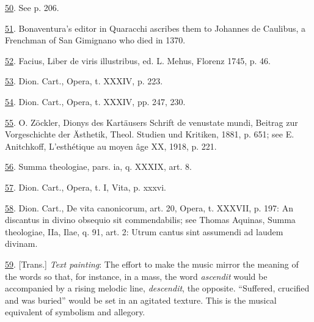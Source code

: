 \protect\hypertarget{23_NOTES.xhtmlux5cux23id_374}{\protect\hyperlink{20_ILLUSTRATIONS_FOLLOW_PAGE.xhtmlux5cux23id_373}{50}}.
See p. 206.

\protect\hypertarget{23_NOTES.xhtmlux5cux23id_372}{\protect\hyperlink{20_ILLUSTRATIONS_FOLLOW_PAGE.xhtmlux5cux23id_371}{51}}.
Bonaventura's editor in Quaracchi ascribes them to Johannes de Caulibus,
a Frenchman of San Gimignano who died in 1370.

\protect\hypertarget{23_NOTES.xhtmlux5cux23id_370}{\protect\hyperlink{20_ILLUSTRATIONS_FOLLOW_PAGE.xhtmlux5cux23id_369}{52}}.
Facius, Liber de viris illustribus, ed. L. Mehus, Florenz 1745, p. 46.

\protect\hypertarget{23_NOTES.xhtmlux5cux23id_368}{\protect\hyperlink{20_ILLUSTRATIONS_FOLLOW_PAGE.xhtmlux5cux23id_367}{53}}.
Dion. Cart., Opera, t. XXXIV, p. 223.

\protect\hypertarget{23_NOTES.xhtmlux5cux23id_366}{\protect\hyperlink{20_ILLUSTRATIONS_FOLLOW_PAGE.xhtmlux5cux23id_365}{54}}.
Dion. Cart., Opera, t. XXXIV, pp. 247, 230.

\protect\hypertarget{23_NOTES.xhtmlux5cux23id_364}{\protect\hyperlink{20_ILLUSTRATIONS_FOLLOW_PAGE.xhtmlux5cux23id_363}{55}}.
O. Zöckler, Dionys des Kartäusers Schrift de venustate mundi, Beitrag
zur Vorgeschichte der Ästhetik, Theol. Studien und Kritiken, 1881, p.
651; see E. Anitchkoff, L'esthétique au moyen âge XX, 1918, p. 221.

\protect\hypertarget{23_NOTES.xhtmlux5cux23id_362}{\protect\hyperlink{20_ILLUSTRATIONS_FOLLOW_PAGE.xhtmlux5cux23id_361}{56}}.
Summa theologiae, pars. ia, q. XXXIX, art. 8.

\protect\hypertarget{23_NOTES.xhtmlux5cux23id_360}{\protect\hyperlink{20_ILLUSTRATIONS_FOLLOW_PAGE.xhtmlux5cux23id_359}{57}}.
Dion. Cart., Opera, t. I, Vita, p. xxxvi.

\protect\hypertarget{23_NOTES.xhtmlux5cux23id_358}{\protect\hyperlink{20_ILLUSTRATIONS_FOLLOW_PAGE.xhtmlux5cux23id_357}{58}}.
Dion. Cart., De vita canonicorum, art. 20, Opera, t. XXXVII, p. 197: An
discantus in divino obsequio sit commendabilis; see Thomas Aquinas,
Summa theologiae, IIa, Ilae, q. 91, art. 2: Utrum cantus sint assumendi
ad laudem divinam.

\protect\hypertarget{23_NOTES.xhtmlux5cux23id_356}{\protect\hyperlink{20_ILLUSTRATIONS_FOLLOW_PAGE.xhtmlux5cux23id_355}{59}}.
{[}Trans.{]} \emph{Text painting}: The effort to make the music mirror
the meaning of the words so that, for instance, in a mass, the word
\emph{ascendit} would be accompanied by a rising melodic line,
\emph{descendit}, the opposite. ``Suffered, crucified and was buried''
would be set in an agitated texture. This is the musical equivalent of
symbolism and allegory.

